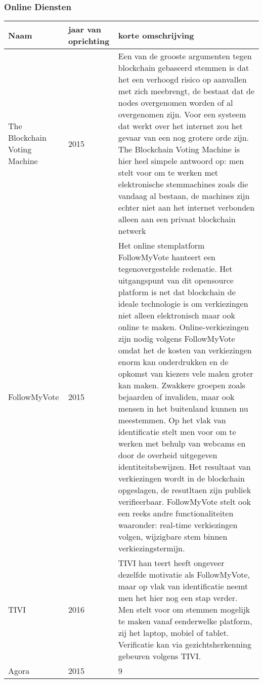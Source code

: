 			\subsubsection{Online Diensten}
				\begin{center}
					\begin{tabular}{ l | l | l | }
						\hline
						Naam & jaar van oprichting & korte omschrijving \\ \hline
						The Blockchain Voting Machine  & 2015 &  Een van de grooste argumenten tegen blockchain gebaseerd stemmen is dat het een verhoogd risico op aanvallen met zich meebrengt, de bestaat  dat de nodes overgenomen worden of al overgenomen zijn. Voor een systeem dat werkt over het internet zou het gevaar van een nog grotere orde zijn. The Blockchain Voting Machine is hier heel simpele antwoord op: men stelt voor om te werken met elektronische stemmachines zoals die vandaag al bestaan,   de machines zijn echter niet aan het internet verbonden alleen aan een privaat blockchain netwerk \\ \hline
						FollowMyVote & 2015 &  Het online stemplatform FollowMyVote hanteert een tegenovergestelde redenatie. Het uitgangspunt van dit opensource platform is net dat blockchain de ideale technologie is om verkiezingen niet alleen elektronisch maar ook online te maken. Online-verkiezingen zijn nodig volgens FollowMyVote omdat het de kosten van verkiezingen enorm kan onderdrukken en de opkomst van kiezers vele malen groter kan maken.  Zwakkere groepen zoals bejaarden of invaliden, maar ook mensen in het buitenland kunnen nu  meestemmen.  Op het vlak van identificatie stelt men voor om te werken met behulp van webcams en door de overheid uitgegeven identiteitsbewijzen. Het resultaat van verkiezingen wordt in de blockchain opgeslagen, de resutltaen zijn publiek verifieerbaar. FollowMyVote stelt ook een reeks andre functionaliteiten waaronder: real-time verkiezingen volgen, wijzigbare stem binnen verkiezingstermijn. \\ \hline
						TIVI & 2016 & TIVI han teert heeft ongeveer dezelfde motivatie als FollowMyVote, maar op vlak van identificatie neemt men het hier nog een stap verder. Men stelt voor om stemmen mogelijk te maken vanaf eenderwelke platform, zij het laptop, mobiel of tablet. Verificatie kan via gezichtsherkenning gebeuren volgens TIVI. \\ \hline
						Agora & 2015 & 9 \\ \hline
					\end{tabular}
				\end{center}

